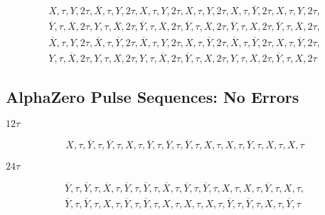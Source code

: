 \begin{equation*}
\begin{aligned}
    X, \tau, Y, 2\tau, \overline{X}, \tau, Y, 2\tau, X, \tau, Y, 2\tau,
    X, \tau, Y, 2\tau, X, \tau, \overline{Y}, 2\tau, X, \tau, Y, 2\tau, \\
    \overline{Y}, \tau, \overline{X}, 2\tau, Y, \tau, \overline{X}, 2\tau,
    \overline{Y}, \tau, \overline{X}, 2\tau, \overline{Y}, \tau, \overline{X},
    2\tau, \overline{Y}, \tau, X, 2\tau, \overline{Y}, \tau, \overline{X},
    2\tau, \\
    \overline{X}, \tau, Y, 2\tau, \overline{X}, \tau, \overline{Y}, 2\tau,
    \overline{X}, \tau, Y, 2\tau, X, \tau, \overline{Y}, 2\tau, \overline{X},
    \tau, \overline{Y}, 2\tau, X, \tau, \overline{Y}, 2\tau, \\
    Y, \tau, \overline{X}, 2\tau, Y, \tau, X, 2\tau, Y, \tau, \overline{X}, 2\tau, \overline{Y}, \tau, X, 2\tau, Y, \tau, X, 2\tau, \overline{Y}, \tau, X, 2\tau
\end{aligned}
\end{equation*}

\subsection{AlphaZero Pulse Sequences: No Errors}

\noindent $12\tau$

\begin{equation*}
\begin{aligned}
    X, \tau, \overline{Y}, \tau, \overline{Y}, \tau, X, \tau, \overline{Y}, \tau, \overline{Y}, \tau, \overline{Y}, \tau, X, \tau, X, \tau, \overline{Y}, \tau, X, \tau, X, \tau
\end{aligned}
\end{equation*}

\noindent $24\tau$

\begin{equation*}
\begin{aligned}
    \overline{Y}, \tau, \overline{Y}, \tau, \overline{X}, \tau, \overline{Y}, \tau, \overline{Y}, \tau, \overline{X}, \tau, \overline{Y}, \tau, \overline{Y}, \tau, X, \tau, X, \tau, \overline{Y}, \tau, X, \tau, \\
    \overline{Y}, \tau, \overline{Y}, \tau, X, \tau, \overline{Y}, \tau, \overline{Y}, \tau, X, \tau, X, \tau, X, \tau, \overline{Y}, \tau, \overline{Y}, \tau, X, \tau, \overline{Y}, \tau
\end{aligned}
\end{equation*}

